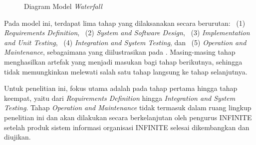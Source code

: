 \begin{figure}[H]
	\centering
	\usetikzlibrary{shapes.geometric, positioning}
	\caption{Diagram Model \textit{Waterfall}}
	\label{fig:waterfall}
\end{figure}

Pada model ini, terdapat lima tahap yang dilaksanakan secara berurutan: ~(1) \textit{Requirements Definition}, ~(2) \textit{System and Software Design}, ~(3) \textit{Implementation and Unit Testing}, ~(4) \textit{Integration and System Testing}, dan ~(5) \textit{Operation and Maintenance}, sebagaimana yang diilustrasikan pada . Masing-masing tahap menghasilkan artefak yang menjadi masukan bagi tahap berikutnya, sehingga tidak memungkinkan melewati salah satu tahap langsung ke tahap selanjutnya.

Untuk penelitian ini, fokus utama adalah pada tahap pertama hingga tahap keempat, yaitu dari \textit{Requirements Definition} hingga \textit{Integration and System Testing}. Tahap \textit{Operation and Maintenance} tidak termasuk dalam ruang lingkup penelitian ini dan akan dilakukan secara berkelanjutan oleh pengurus INFINITE setelah produk sistem informasi organisasi INFINITE selesai dikembangkan dan diujikan.

